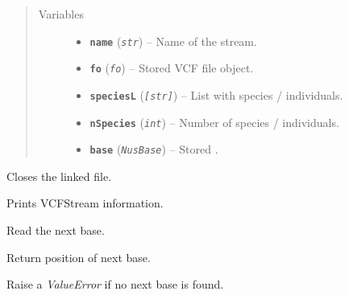 \documentclass[letterpaper,10pt,english]{sphinxmanual}
\begin{document}
\begin{fulllineitems}
\begin{quote}
\begin{description}
\begin{itemize}
\end{itemize}

\item[{Variables}] \leavevmode\begin{itemize}
\item {} 
\textbf{\texttt{name}} (\emph{\texttt{str}}) -- Name of the stream.

\item {} 
\textbf{\texttt{fo}} (\emph{\texttt{fo}}) -- Stored VCF file object.

\item {} 
\textbf{\texttt{speciesL}} (\emph{\texttt{{[}str{]}}}) -- List with species / individuals.

\item {} 
\textbf{\texttt{nSpecies}} (\emph{\texttt{int}}) -- Number of species / individuals.

\item {} 
\textbf{\texttt{base}} (\emph{\texttt{NusBase}}) -- Stored {\hyperref[vcf:libPoMo.vcf.NucBase]{}}.

\end{itemize}

\end{description}\end{quote}

\begin{fulllineitems}
\label{vcf:libPoMo.vcf.VCFStream.close}
Closes the linked file.

\end{fulllineitems}


\begin{fulllineitems}
\label{vcf:libPoMo.vcf.VCFStream.print_info}
Prints VCFStream information.

\end{fulllineitems}


\begin{fulllineitems}
\label{vcf:libPoMo.vcf.VCFStream.read_next_base}
Read the next base.

Return position of next base.

Raise a \emph{ValueError} if no next base is found.

\end{fulllineitems}


\end{fulllineitems}
\end{document}

